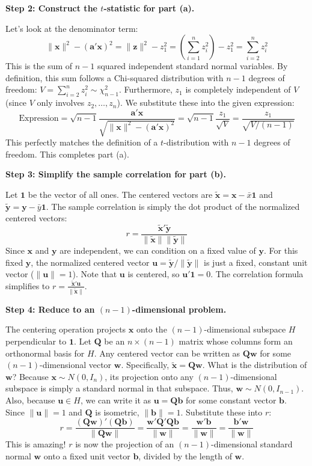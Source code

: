 \begin{solution}
\textbf{Step 2: Construct the $t$-statistic for part (a).}

Let's look at the denominator term:
\[ \|\mathbf{x}\|^2 - (\mathbf{a}'\mathbf{x})^2 = \|\mathbf{z}\|^2 - z_1^2 = \left(\sum_{i=1}^n z_i^2\right) - z_1^2 = \sum_{i=2}^n z_i^2 \]
This is the sum of $n-1$ squared independent standard normal variables. By definition, this sum follows a Chi-squared distribution with $n-1$ degrees of freedom: $V = \sum_{i=2}^n z_i^2 \sim \chi^2_{n-1}$.
Furthermore, $z_1$ is completely independent of $V$ (since $V$ only involves $z_2, \dots, z_n$).
We substitute these into the given expression:
\[ \text{Expression} = \sqrt{n-1}\frac{\mathbf{a}'\mathbf{x}}{\sqrt{\|\mathbf{x}\|^2 - (\mathbf{a}'\mathbf{x})^2}} = \sqrt{n-1} \frac{z_1}{\sqrt{V}} = \frac{z_1}{\sqrt{V / (n-1)}} \]
This perfectly matches the definition of a $t$-distribution with $n-1$ degrees of freedom. This completes part (a).

\textbf{Step 3: Simplify the sample correlation for part (b).}

Let $\mathbf{1}$ be the vector of all ones. The centered vectors are $\tilde{\mathbf{x}} = \mathbf{x} - \bar{x}\mathbf{1}$ and $\tilde{\mathbf{y}} = \mathbf{y} - \bar{y}\mathbf{1}$.
The sample correlation is simply the dot product of the normalized centered vectors:
\[ r = \frac{\tilde{\mathbf{x}}' \tilde{\mathbf{y}}}{\|\tilde{\mathbf{x}}\| \|\tilde{\mathbf{y}}\|} \]
Since $\mathbf{x}$ and $\mathbf{y}$ are independent, we can condition on a fixed value of $\mathbf{y}$. For this fixed $\mathbf{y}$, the normalized centered vector $\mathbf{u} = \tilde{\mathbf{y}}/\|\tilde{\mathbf{y}}\|$ is just a fixed, constant unit vector ($\|\mathbf{u}\| = 1$). Note that $\mathbf{u}$ is centered, so $\mathbf{u}'\mathbf{1} = 0$.
The correlation formula simplifies to $r = \frac{\tilde{\mathbf{x}}' \mathbf{u}}{\|\tilde{\mathbf{x}}\|}$.

\textbf{Step 4: Reduce to an $(n-1)$-dimensional problem.}

The centering operation projects $\mathbf{x}$ onto the $(n-1)$-dimensional subspace $H$ perpendicular to $\mathbf{1}$.
Let $\mathbf{Q}$ be an $n \times (n-1)$ matrix whose columns form an orthonormal basis for $H$.
Any centered vector can be written as $\mathbf{Q}\mathbf{w}$ for some $(n-1)$-dimensional vector $\mathbf{w}$.
Specifically, $\tilde{\mathbf{x}} = \mathbf{Q}\mathbf{w}$. What is the distribution of $\mathbf{w}$?
Because $\mathbf{x} \sim N(0, I_n)$, its projection onto any $(n-1)$-dimensional subspace is simply a standard normal in that subspace. Thus, $\mathbf{w} \sim N(0, I_{n-1})$.
Also, because $\mathbf{u} \in H$, we can write it as $\mathbf{u} = \mathbf{Q}\mathbf{b}$ for some constant vector $\mathbf{b}$. Since $\|\mathbf{u}\|=1$ and $\mathbf{Q}$ is isometric, $\|\mathbf{b}\|=1$.
Substitute these into $r$:
\[ r = \frac{(\mathbf{Q}\mathbf{w})' (\mathbf{Q}\mathbf{b})}{\|\mathbf{Q}\mathbf{w}\|} = \frac{\mathbf{w}'\mathbf{Q}'\mathbf{Q}\mathbf{b}}{\|\mathbf{w}\|} = \frac{\mathbf{w}'\mathbf{b}}{\|\mathbf{w}\|} = \frac{\mathbf{b}'\mathbf{w}}{\|\mathbf{w}\|} \]
This is amazing! $r$ is now the projection of an $(n-1)$-dimensional standard normal $\mathbf{w}$ onto a fixed unit vector $\mathbf{b}$, divided by the length of $\mathbf{w}$.


\end{solution}
